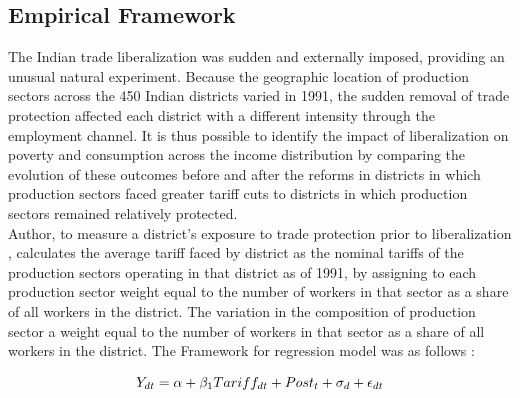\documentclass[a4paper,12pt]{article}
\begin{document}
\subsection{Empirical Framework}
The Indian trade liberalization was sudden and externally imposed, providing an unusual natural experiment. Because the geographic location of production sectors  across the 450 Indian districts varied in 1991, the sudden removal of trade protection affected each district with a different intensity through the employment channel. It is thus possible to identify the impact of liberalization on poverty and consumption across the income distribution by comparing the evolution of these outcomes before and after the reforms in districts in which production sectors faced greater tariff cuts to districts in which production sectors remained relatively protected. 
\\Author, to measure a district's exposure to trade protection prior to liberalization  , calculates the average tariff faced by district as the nominal tariffs of the production sectors operating in that district as of 1991, by assigning to each production sector weight equal to the number of workers in that sector as a share of all workers in the district. The variation in the composition of production sector a weight equal to the number of workers in that sector as a share of all workers in the district. The Framework for regression model was as follows : 

\begin{equation}
\centering
Y_{dt} = \alpha + \beta_1 Tariff_{dt} + Post_t + \sigma_d + \epsilon_{dt}
\end{equation}
\end{document}
